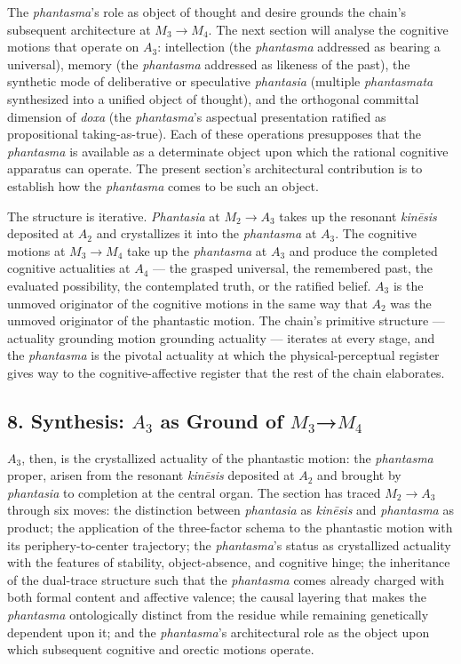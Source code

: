 \documentclass[12pt]{article}
\begin{document}
The \textit{phantasma}'s role as object of thought and desire grounds the chain's subsequent architecture at $M_3$$\to$$M_4$. The next section will analyse the cognitive motions that operate on $A_3$: intellection (the \textit{phantasma} addressed as bearing a universal), memory (the \textit{phantasma} addressed as likeness of the past), the synthetic mode of deliberative or speculative \textit{phantasia} (multiple \textit{phantasmata} synthesized into a unified object of thought), and the orthogonal committal dimension of \textit{doxa} (the \textit{phantasma}'s aspectual presentation ratified as propositional taking-as-true). Each of these operations presupposes that the \textit{phantasma} is available as a determinate object upon which the rational cognitive apparatus can operate. The present section's architectural contribution is to establish how the \textit{phantasma} comes to be such an object.

The structure is iterative. \textit{Phantasia} at $M_2$$\to$$A_3$ takes up the resonant \textit{kinēsis} deposited at $A_2$ and crystallizes it into the \textit{phantasma} at $A_3$. The cognitive motions at $M_3$$\to$$M_4$ take up the \textit{phantasma} at $A_3$ and produce the completed cognitive actualities at $A_4$ --- the grasped universal, the remembered past, the evaluated possibility, the contemplated truth, or the ratified belief. $A_3$ is the unmoved originator of the cognitive motions in the same way that $A_2$ was the unmoved originator of the phantastic motion. The chain's primitive structure --- actuality grounding motion grounding actuality --- iterates at every stage, and the \textit{phantasma} is the pivotal actuality at which the physical-perceptual register gives way to the cognitive-affective register that the rest of the chain elaborates.

\subsection*{8. Synthesis: $A_3$ as Ground of $M_3$→$M_4$}

$A_3$, then, is the crystallized actuality of the phantastic motion: the \textit{phantasma} proper, arisen from the resonant \textit{kinēsis} deposited at $A_2$ and brought by \textit{phantasia} to completion at the central organ. The section has traced $M_2$$\to$$A_3$ through six moves: the distinction between \textit{phantasia} as \textit{kinēsis} and \textit{phantasma} as product; the application of the three-factor schema to the phantastic motion with its periphery-to-center trajectory; the \textit{phantasma}'s status as crystallized actuality with the features of stability, object-absence, and cognitive hinge; the inheritance of the dual-trace structure such that the \textit{phantasma} comes already charged with both formal content and affective valence; the causal layering that makes the \textit{phantasma} ontologically distinct from the residue while remaining genetically dependent upon it; and the \textit{phantasma}'s architectural role as the object upon which subsequent cognitive and orectic motions operate.
\end{document}
